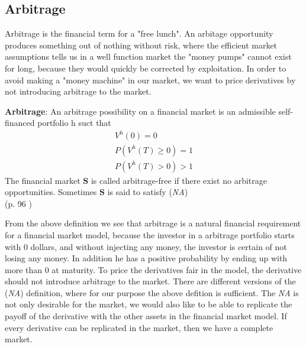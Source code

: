 \subsection{Arbitrage}
Arbitrage is the financial term for a "free lunch". An arbitage opportunity produces something out of nothing without risk, where the efficient market assumptions tells us in a well function market the "money pumps" cannot exist for long, because they would quickly be corrected by exploitation. In order to avoid making a "money machine" in our market, we want to price derivatives by not introducing arbitrage to the market.  
\theoremstyle{definition}
\begin{definition}{\textbf{Arbitrage}:}
An arbitrage possibility on a financial market is an admissible self-financed portfolio h suct that
\begin{equation}\label{Arbitrage}
\begin{split}
V^{h}(0)=0\\
P(V^{h}(T)\geq 0)=1\\
P(V^{h}(T)>0)>1
\end{split}
\end{equation}
The financial market $\bm{S}$ is called arbitrage-free if there exist no arbitrage opportunities. Sometimes $\bm{S}$ is said to satisfy (\textit{NA})\\
(p. 96 \parencite{finKont})
\end{definition}
From the above definition we see that arbitrage is a natural financial requirement for a financial market model, because the investor in a arbitrage portfolio starts with 0 dollars, and without injecting any money, the investor is certain of not losing any money. In addition he has a positive probability by ending up with more than 0 at maturity. To price the derivatives fair in the model, the derivative should not introduce arbitrage to the market. There are different versions of the (\textit{NA}) definition, where for our purpose the above defition is sufficient. The \textit{NA} is not only desirable for the market, we would also like to be able to replicate the payoff of the derivative with the other assets in the financial market model. If every derivative can be replicated in the market, then we have a complete market.


